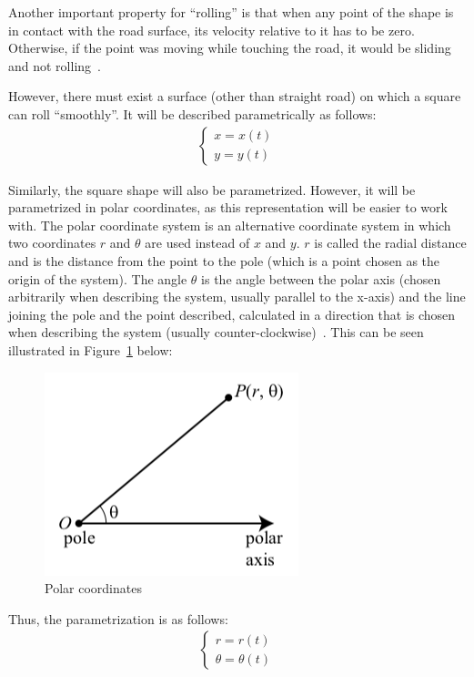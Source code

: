 \documentclass[12pt]{article}
\begin{document}
        Another important property for ``rolling'' is that when any point of the shape is in contact with the road surface, its velocity relative to it has to be zero. Otherwise, if the point was moving while touching the road, it would be sliding and not rolling~\cite{morphocular.2022}.

        However, there must exist a surface (other than straight road) on which a square can roll ``smoothly''. It will be described parametrically as follows:
        \begin{align}
            \begin{cases}
            x = x(t) \\
            y = y(t)
            \end{cases}
        \end{align}

        Similarly, the square shape will also be parametrized. However, it will be parametrized in polar coordinates, as this representation will be easier to work with. The polar coordinate system is an alternative coordinate system in which two coordinates $r$ and $\theta$ are used instead of $x$ and $y$. $r$ is called the radial distance and is the distance from the point to the pole (which is a point chosen as the origin of the system). The angle $\theta$ is the angle between the polar axis (chosen arbitrarily when describing the system, usually parallel to the x-axis) and the line joining the pole and the point described, calculated in a direction that is chosen when describing the system (usually counter-clockwise)~\cite{Sundstrom2021Polar}. This can be seen illustrated in Figure~\ref{fig:polar_definition} below:

        \begin{figure}[]
            \centering\includegraphics[width=0.3\linewidth]{images/polar_definition.png}
            \caption[Polar coordinate system]{Polar coordinates~\cite{Sundstrom2021Polar}}\label{fig:polar_definition}
        \end{figure}
        
        Thus, the parametrization is as follows: 
        \begin{align}
            \begin{cases}
            r = r(t) \\
            \theta = \theta(t)
            \end{cases}
        \end{align}
\end{document}
